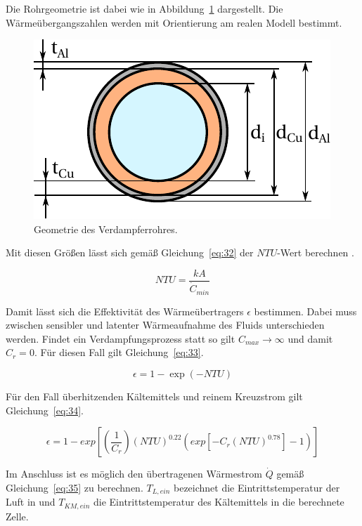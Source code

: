 Die Rohrgeometrie ist dabei wie in Abbildung~\ref{fig:Geometrie} dargestellt.
Die Wärmeübergangszahlen werden mit Orientierung am realen Modell bestimmt.

\begin{figure}[h]
\centering
\includegraphics[scale=1]{Pictures/Rohrgeometrie.pdf}
\caption{Geometrie des Verdampferrohres.}
\label{fig:Geometrie}
\end{figure}



Mit diesen Größen lässt sich gemäß Gleichung~\ref{eq:32} der $NTU$-Wert berechnen \cite{McDonald.2012}.

\begin{equation}
\label{eq:32}
NTU = \frac{kA}{\dot{C}_{min}}
\end{equation}

Damit lässt sich die Effektivität des Wärmeübertragers $\epsilon$ bestimmen.
Dabei muss zwischen sensibler und latenter Wärmeaufnahme des Fluids unterschieden werden.
Findet ein Verdampfungsprozess statt so gilt $C_{max}\longrightarrow\infty$ und damit $C_r =0$. Für diesen Fall gilt Gleichung~\ref{eq:33}.

\begin{equation}
\label{eq:33}
\epsilon = 1- \exp{(-NTU)}
\end{equation}

Für den Fall überhitzenden Kältemittels und reinem Kreuzstrom gilt Gleichung~\ref{eq:34}.

\begin{equation}
\label{eq:34}
\epsilon = 1- exp{\left[\left(\frac{1}{C_r}\right)(NTU)^{0.22}(exp{[-C_r(NTU)^{0.78}]}-1)\right]}
\end{equation}

\clearpage

Im Anschluss ist es  möglich den übertragenen Wärmestrom $\dot{Q}$ gemäß Gleichung~\ref{eq:35} zu berechnen. $T_{L,ein}$ bezeichnet die Eintrittstemperatur der Luft in und $T_{KM,ein}$ die Eintrittstemperatur des Kältemittels in die berechnete Zelle.


